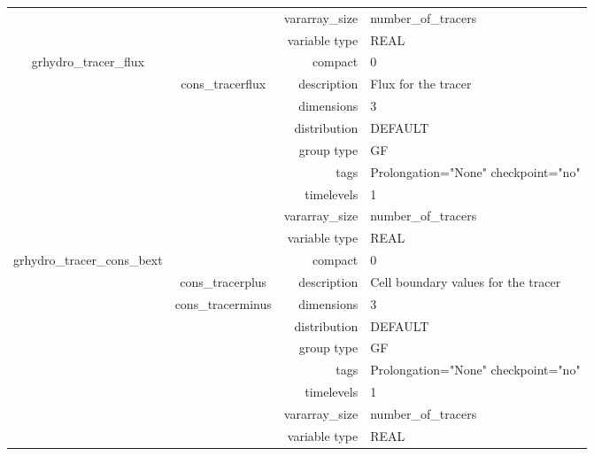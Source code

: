 \begin{tabular*}{150mm}{|c|c@{\extracolsep{\fill}}|rl|}
 &  & vararray\_size & number\_of\_tracers \\ 
 &  & variable type & REAL \\ 
\hline 
grhydro\_tracer\_flux &  & compact & 0 \\ 
 & cons\_tracerflux & description & Flux for the tracer \\ 
 &  & dimensions & 3 \\ 
 &  & distribution & DEFAULT \\ 
 &  & group type & GF \\ 
 &  & tags & Prolongation="None" checkpoint="no" \\ 
 &  & timelevels & 1 \\ 
 &  & vararray\_size & number\_of\_tracers \\ 
 &  & variable type & REAL \\ 
\hline 
grhydro\_tracer\_cons\_bext &  & compact & 0 \\ 
 & cons\_tracerplus & description & Cell boundary values for the tracer \\ 
 & cons\_tracerminus & dimensions & 3 \\ 
 &  & distribution & DEFAULT \\ 
 &  & group type & GF \\ 
 &  & tags & Prolongation="None" checkpoint="no" \\ 
 &  & timelevels & 1 \\ 
 &  & vararray\_size & number\_of\_tracers \\ 
 &  & variable type & REAL \\ 
\hline 
\end{tabular*} 



\vspace{5mm}
\vspace{5mm}

